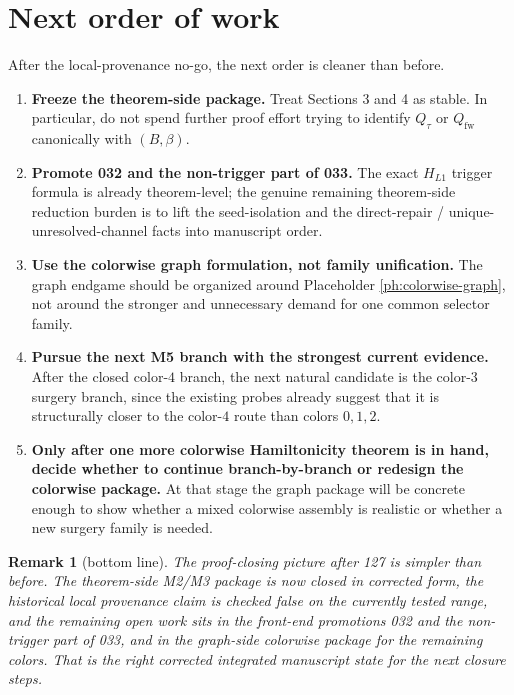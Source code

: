 \documentclass[11pt]{article}
\newtheorem{remark}[theorem]{Remark}
\begin{document}
\section{Next order of work}

After the local-provenance no-go, the next order is cleaner than before.

\begin{enumerate}[label=\textup{(\arabic*)},leftmargin=2.7em]
\item \textbf{Freeze the theorem-side package.}
      Treat Sections 3 and 4 as stable.
      In particular, do not spend further proof effort trying to identify
      $Q_{\tau}$ or $Q_{\mathrm{fw}}$ canonically with $(B,\beta)$.

\item \textbf{Promote \textup{032} and the non-trigger part of \textup{033}.}
      The exact $H_{L1}$ trigger formula is already theorem-level; the genuine
      remaining theorem-side reduction burden is to lift the seed-isolation and
      the direct-repair / unique-unresolved-channel facts into manuscript order.

\item \textbf{Use the colorwise graph formulation, not family unification.}
      The graph endgame should be organized around Placeholder
      \ref{ph:colorwise-graph}, not around the stronger and unnecessary demand
      for one common selector family.

\item \textbf{Pursue the next M5 branch with the strongest current evidence.}
      After the closed color-$4$ branch, the next natural candidate is the
      color-$3$ surgery branch, since the existing probes already suggest that
      it is structurally closer to the color-$4$ route than colors $0,1,2$.

\item \textbf{Only after one more colorwise Hamiltonicity theorem is in hand,
      decide whether to continue branch-by-branch or redesign the colorwise
      package.}
      At that stage the graph package will be concrete enough to show whether a
      mixed colorwise assembly is realistic or whether a new surgery family is
      needed.
\end{enumerate}

\begin{remark}[bottom line]
The proof-closing picture after 127 is simpler than before.
The theorem-side M2/M3 package is now closed in corrected form, the historical
local provenance claim is checked false on the currently tested range, and the
remaining open work sits in the front-end promotions \textup{032} and the
non-trigger part of \textup{033}, and in the graph-side colorwise package for
the remaining colors.
That is the right corrected integrated manuscript state for the next closure
steps.
\end{remark}
\end{document}
